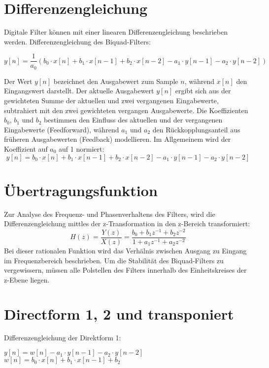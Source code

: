 \documentclass[
  ngerman,
  letterpaper,
  DIV=11]{scrreprt}
\begin{document}
\chapter{Differenzengleichung}\label{differenzengleichung}

Digitale Filter können mit einer linearen Differenzengleichung
beschrieben werden. Differenzengleichung des Biquad-Filters:

\[
y[n] =  \frac{1}{a_0}(b_0 \cdot x[n] + b_1 \cdot x[n - 1] + b_2 \cdot x[n - 2] - a_1 \cdot y[n - 1] - a_2 \cdot y[n - 2])
\]

Der Wert \(y[n]\) bezeichnet den Ausgabewert zum Sample \(n\), während
\(x[n]\) den Eingangswert darstellt. Der aktuelle Ausgabewert \(y[n]\)
ergibt sich aus der gewichteten Summe der aktuellen und zwei vergangenen
Eingabewerte, subtrahiert mit den zwei gewichteten vergangen
Ausgabewerte. Die Koeffizienten \(b_0\), \(b_1\) und \(b_2\) bestimmen
den Einfluss des aktuellen und der vergangenen Eingabewerte
(Feedforward), während \(a_1\) und \(a_2\) den Rückkopplungsanteil aus
früheren Ausgabewerten (Feedback) modellieren. Im Allgemeinem wird der
Koeffizient auf \(a_0\) auf 1 normiert: \[
y[n] = b_0 \cdot x[n] + b_1 \cdot x[n - 1] + b_2 \cdot x[n - 2] - a_1 \cdot y[n - 1] - a_2 \cdot y[n - 2]
\]

\chapter{Übertragungsfunktion}\label{uxfcbertragungsfunktion}

Zur Analyse des Frequenz- und Phasenverhaltens des Filters, wird die
Differenzengleichung mittles der z-Transformation in den z-Bereich
transformiert: \[
H(z) = \frac{Y(z)}{X(z)} = \frac{b_0 + b_1 z^{-1} + b_2 z^{-2}}{1 + a_1 z^{-1} + a_2 z^{-2}}
\] Bei dieser rationalen Funktion wird das Verhälnis zwischen Ausgang zu
Eingang im Frequenzbereich beschrieben. Um die Stabilität des
Biquad-Filters zu vergewissern, müssen alle Polstellen des Filters
innerhalb des Einheitskreises der z-Ebene liegen.

\chapter{Directform 1, 2 und
transponiert}\label{directform-1-2-und-transponiert}

Differenzengleichung der Direktform 1:

\(y[n] = w[n] - a_1 \cdot y[n-1] - a_2 \cdot y[n-2]\)
\(w[n] = b_0 \cdot x[n] + b_1 \cdot x[n - 1] + b_2\)
\end{document}
